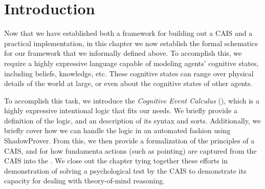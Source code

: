 \section{Introduction}

Now that we have established both a framework for building out a CAIS and
a practical implementation, in this chapter we now establish the formal
schematics for our framework that we informally defined above. To accomplish
this, we require a highly expressive language capable of modeling agents'
cognitive states, including beliefs, knowledge, etc. These cognitive states
can range over physical details of the world at large, or even about the
cognitive states of other agents.

To accomplish this task, we introduce the \textit{Cognitive Event
Calculus} (\CEC), which is a highly expressive intentional logic that fits
our needs. We briefly provide a definition of the logic, and an description
of its syntax and sorts. Additionally, we briefly cover how we can handle
the logic in an automated fashion using ShadowProver. From this, we then
provide a formalization of the principles of a CAIS, and for how fundamenta
actions (such as pointing) are captured from the CAIS into the \CEC. We
close out the chapter tying together these efforts in demonstration of
solving a psychological test by the CAIS to demonstrate its capacity
for dealing with theory-of-mind reasoning.
